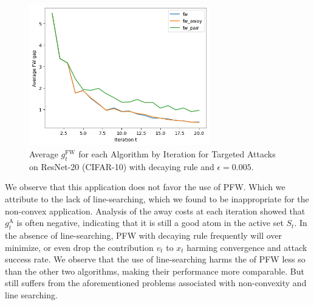 \documentclass{article}
\begin{document}
\begin{figure}[H]
    \centering
    \includegraphics[width=0.7\textwidth]{plots/mdl_compare_avg_FWgap_by_iter.png}
    \caption{Average $g^\text{FW}_t$ for each Algorithm by Iteration for Targeted Attacks on ResNet-20 (CIFAR-10) with decaying rule and $\epsilon = 0.005$.}
    \label{fig:converge-compare}
\end{figure}

We observe that this application does not favor the use of PFW. Which we attribute to the lack of line-searching, which we found to be inappropriate for the non-convex application. Analysis of the away costs at each iteration showed that $g_t^\text{A}$ is often negative, indicating that it is still a good atom in the active set $S_t$. In the absence of line-searching, PFW with decaying rule frequently will over minimize, or even drop the contribution $v_t$ to $x_t$ harming convergence and attack success rate. We observe that the use of line-searching harms the  of PFW less so than the other two algorithms, making their performance more comparable. But still suffers from the aforementioned problems associated with non-convexity and line searching.
\end{document}

